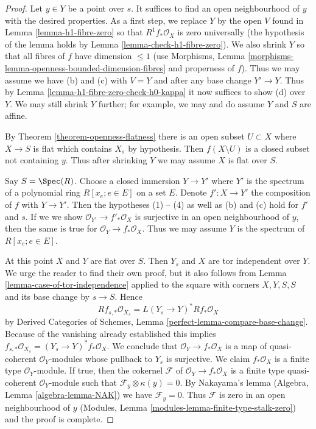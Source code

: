 \begin{proof}
Let $y \in Y$ be a point over $s$.
It suffices to find an open neighbourhood of $y$
with the desired properties. As a first step, we replace $Y$
by the open $V$ found in Lemma \ref{lemma-h1-fibre-zero} so that
$R^1f_*\mathcal{O}_X$ is zero universally (the hypothesis of
the lemma holds by Lemma \ref{lemma-check-h1-fibre-zero}).
We also shrink $Y$ so that all fibres of $f$ have dimension $\leq 1$
(use Morphisms, Lemma
\ref{morphisms-lemma-openness-bounded-dimension-fibres}
and properness of $f$). Thus we may assume we have (b) and (c)
with $V = Y$ and after any base change $Y' \to Y$.
Thus by Lemma \ref{lemma-h1-fibre-zero-check-h0-kappa}
it now suffices to show (d) over $Y$.
We may still shrink $Y$ further; for example, we may and do
assume $Y$ and $S$ are affine.

\medskip\noindent
By Theorem \ref{theorem-openness-flatness}
there is an open subset $U \subset X$ where $X \to S$
is flat which contains $X_s$ by hypothesis.
Then $f(X \setminus U)$ is a closed subset
not containing $y$. Thus after shrinking $Y$
we may assume $X$ is flat over $S$.

\medskip\noindent
Say $S = \Spec(R)$. Choose a closed immersion $Y \to Y'$ where $Y'$
is the spectrum of a polynomial ring $R[x_e; e \in E]$ on a set $E$.
Denote $f' : X \to Y'$ the composition of $f$ with $Y \to Y'$.
Then the hypotheses (1) -- (4) as well as (b) and (c)
hold for $f'$ and $s$. If we we show $\mathcal{O}_{Y'} \to f'_*\mathcal{O}_X$
is surjective in an open neighbourhood of $y$, then the same is true for
$\mathcal{O}_Y \to f_*\mathcal{O}_X$. Thus we may assume $Y$ is
the spectrum of $R[x_e; e \in E]$.

\medskip\noindent
At this point $X$ and $Y$ are flat over $S$. Then $Y_s$ and $X$
are tor independent over $Y$. We urge the reader to find their own
proof, but it also follows from
Lemma \ref{lemma-case-of-tor-independence} applied to the
square with corners $X, Y, S, S$ and its base change by $s \to S$.
Hence
$$
Rf_{s, *}\mathcal{O}_{X_s} = L(Y_s \to Y)^*Rf_*\mathcal{O}_X
$$
by Derived Categories of Schemes, Lemma
\ref{perfect-lemma-compare-base-change}.
Because of the vanishing already established this implies
$f_{s, *}\mathcal{O}_{X_s} = (Y_s \to Y)^*f_*\mathcal{O}_X$.
We conclude that $\mathcal{O}_Y \to f_*\mathcal{O}_X$ is a map of
quasi-coherent $\mathcal{O}_Y$-modules whose pullback
to $Y_s$ is surjective. We claim
$f_*\mathcal{O}_X$ is a finite type $\mathcal{O}_Y$-module.
If true, then the cokernel $\mathcal{F}$ of
$\mathcal{O}_Y \to f_*\mathcal{O}_X$
is a finite type quasi-coherent $\mathcal{O}_Y$-module
such that $\mathcal{F}_y \otimes \kappa(y) = 0$.
By Nakayama's lemma (Algebra, Lemma \ref{algebra-lemma-NAK})
we have $\mathcal{F}_y = 0$. Thus $\mathcal{F}$ is zero
in an open neighbourhood of $y$
(Modules, Lemma \ref{modules-lemma-finite-type-stalk-zero})
and the proof is complete.


\end{proof}
